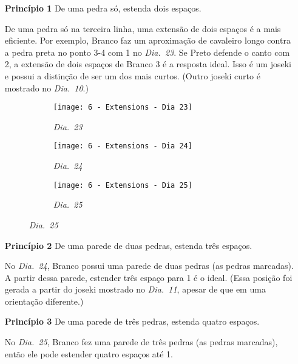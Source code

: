 \begin{itemize}
    \item[\textbf{Princípio 1}] De uma pedra só, estenda dois espaços.
        
        De uma pedra só na terceira linha, uma extensão de dois espaços é a mais eficiente. Por exemplo, Branco faz um aproximação de cavaleiro longo contra a pedra preta no ponto 3-4 com 1 no \emph{Dia.\@~23}. Se Preto defende o canto com 2, a extensão de dois espaços de Branco 3 é a resposta ideal. Isso é um joseki e possui a distinção de ser um dos mais curtos. (Outro joseki curto é mostrado no \emph{Dia.\@~10}.)
    
    \begin{figure}[h!]
        \centering
        \begin{subfigure}[t]{.3\textwidth}
            \centering
            \texttt{[image: 6 - Extensions - Dia 23]}
            \captionsetup{justification=centering}
            \caption*{\emph{Dia.\@~23}}
        \end{subfigure}
        \hfill
        \begin{subfigure}[t]{.3\textwidth}
            \centering
            \texttt{[image: 6 - Extensions - Dia 24]}
            \captionsetup{justification=centering}
            \caption*{\emph{Dia.\@~24}}
        \end{subfigure}
        \hfill
        \begin{subfigure}[t]{.3\textwidth}
            \centering
            \texttt{[image: 6 - Extensions - Dia 25]}
            \captionsetup{justification=centering}
            \caption*{\emph{Dia.\@~25}}
        \end{subfigure}
    \end{figure}

    \item[\textbf{Princípio 2}] De uma parede de duas pedras, estenda três espaços.
    
        No \emph{Dia.\@~24}, Branco possui uma parede de duas pedras (as pedras marcadas). A partir dessa parede, estender três espaço para 1 é o ideal. (Essa posição foi gerada a partir do joseki mostrado no \emph{Dia.\@~11}, apesar de que em uma orientação diferente.)
    \item[\textbf{Princípio 3}] De uma parede de três pedras, estenda quatro espaços. 

        No \emph{Dia.\@~25}, Branco fez uma parede de três pedras (as pedras marcadas), então ele pode estender quatro espaços até 1.
\end{itemize}

